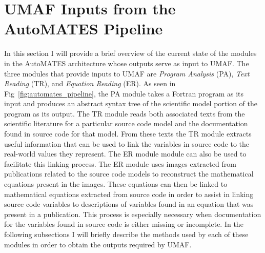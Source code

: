 \section{UMAF Inputs from the AutoMATES Pipeline\label{sec:umaf_inputs}}
In this section I will provide a brief overview of the current state of the modules in the AutoMATES architecture whose outputs serve as input to UMAF.
The three modules that provide inputs to UMAF are \textit{Program Analysis} (PA), \textit{Text Reading} (TR), and \textit{Equation Reading} (ER). As seen in Fig~\ref{fig:automates_pipeline}, the PA module takes a Fortran program as its input and produces an abstract syntax tree of the scientific model portion of the program as its output.
The TR module reads both associated texts from the scientific literature for a particular source code model and the documentation found in source code for that model.
From these texts the TR module extracts useful information that can be used to link the variables in source code to the real-world values they represent.
The ER module module can also be used to facilitate this linking process.
The ER module uses images extracted from publications related to the source code models to reconstruct the mathematical equations present in the images.
These equations can then be linked to mathematical equations extracted from source code in order to assist in linking source code variables to descriptions of variables found in an equation that was present in a publication.
This process is especially necessary when documentation for the variables found in source code is either missing or incomplete.
In the following subsections I will briefly describe the methods used by each of these modules in order to obtain the outputs required by UMAF.

